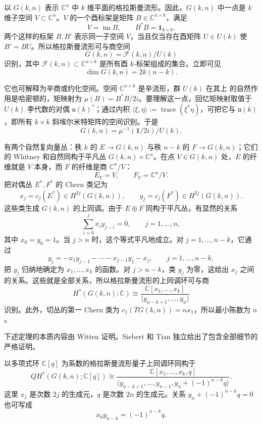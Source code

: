 以 $G(k,n)$ 表示 $\mathbb C^n$ 中 $k$ 维平面的格拉斯曼流形。因此，$G(k,n)$ 中一点是
$k$ 维子空间 $V\subset\mathbb C^n$。$V$ 的一个酉标架是矩阵
$B\in\mathbb C^{n\times k}$，满足
\[
  V=\operatorname{im}B,\qquad B^*B=\mathbf 1_{k\times k}.
\]
两个这样的标架 $B,B'$ 表示同一子空间 $V$，当且仅当存在酉矩阵 $U\in U(k)$ 使
$B'=BU$。所以格拉斯曼流形可与商空间
\[
  G(k,n)=\mathcal F(k,n)/U(k)
\]
识别，其中 $\mathcal F(k,n)\subset\mathbb C^{n\times k}$ 是所有酉 $k$-标架组成的集合。立即可见
\[
  \dim G(k,n)=2k(n-k).
\]

它也可解释为辛商或约化空间。空间 $\mathbb C^{n\times k}$ 是辛流形，群 $U(k)$ 在其上
的自然作用是哈密顿的，矩映射为 $\mu(B)=B^*B/2i$。要理解这一点，回忆矩映射取值于
$U(k)$ 李代数的对偶 $\mathfrak u(k)^*$；通过内积
$\langle\xi,\eta\rangle:=\operatorname{trace}(\xi^*\eta)$，可把它与
$\mathfrak u(k)$，即所有 $k\times k$ 斜埃尔米特矩阵的空间识别。于是
\[
  G(k,n)=\mu^{-1}(\mathbf 1/2i)/U(k).
\]

有两个自然复向量丛：秩 $k$ 的 $E\to G(k,n)$ 与秩 $n-k$ 的 $F\to G(k,n)$；它们的
Whitney 和自然同构于平凡丛 $G(k,n)\times\mathbb C^n$。在点 $V\in G(k,n)$ 处，$E$
的纤维就是 $V$ 本身，而 $F$ 的纤维是商 $\mathbb C^n/V$：
\[
  E_V=V,\qquad F_V=\mathbb C^n/V.
\]
把对偶丛 $E^*,F^*$ 的 Chern 类记为
\[
  x_j=c_j(E^*)\in H^{2j}(G(k,n)),
  \qquad
  y_j=c_j(F^*)\in H^{2j}(G(k,n)).
\]
这些类生成 $G(k,n)$ 的上同调。由于 $E\oplus F$ 同构于平凡丛，有显然的关系
\[
  \sum_{i=0}^j x_i y_{j-i}=0,
  \qquad j=1,\ldots,n,
\]
其中 $x_0=y_0=1$。当 $j>n$ 时，这个等式平凡地成立。对
$j=1,\ldots,n-k$，它通过
\[
  y_j=-x_1y_{j-1}-\cdots-x_{j-1}y_1-x_j,
  \qquad j=1,\ldots,n-k,
\]
把 $y_j$ 归纳地确定为 $x_1,\ldots,x_k$ 的函数。对 $j>n-k$，类 $y_j$ 为零，这给出
$x_j$ 之间的关系。这些就是全部关系，所以格拉斯曼流形的上同调环可与商
\[
  H^*(G(k,n);\mathbb C)\cong
  \frac{\mathbb C[x_1,\ldots,x_k]}
  {\langle y_{n-k+1},\ldots,y_n\rangle}
\]
识别。此外，切丛的第一 Chern 类为
$c_1(TG(k,n))=nx_1$，所以最小陈数为 $n$。

下述定理的本质内容由 Witten  证明。Siebert 和 Tian
 独立给出了包含全部细节的严格证明。

\begin{theorem}\label{thm:11-3-14}
以多项式环 $\mathbb C[q]$ 为系数的格拉斯曼流形量子上同调环同构于
\[
  QH^*(G(k,n);\mathbb C[q])
  \cong
  \frac{\mathbb C[x_1,\ldots,x_k,q]}
  {\langle y_{n-k+1},\ldots,y_{n-1},
  y_n+(-1)^{n-k}q\rangle}.
\]
这里 $x_j$ 是次数 $2j$ 的生成元，$q$ 是次数 $2n$ 的生成元。关系
$y_n+(-1)^{n-k}q=0$ 也可写成
\[
  x_ky_{n-k}=(-1)^{n-k}q.
\]
\end{theorem}

